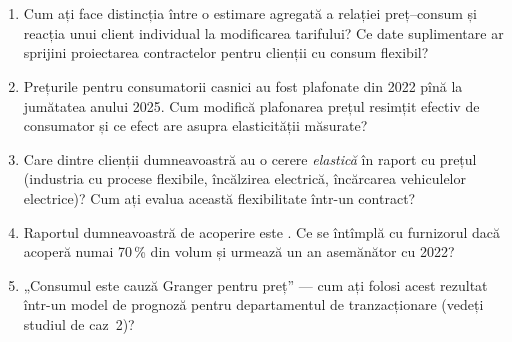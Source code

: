 \section{}
\begin{enumerate}
\item {}%
{Cum ați face distincția între o estimare agregată a relației preț--consum și reacția unui client individual la modificarea tarifului? Ce date suplimentare ar sprijini proiectarea contractelor pentru clienții cu consum flexibil?}
\item {}%
{Prețurile pentru consumatorii casnici au fost plafonate din 2022 pînă la jumătatea anului 2025. Cum modifică plafonarea prețul resimțit efectiv de consumator și ce efect are asupra elasticității măsurate?}
\item {}%
{Care dintre clienții dumneavoastră au o cerere \emph{elastică} în raport cu prețul (industria cu procese flexibile, încălzirea electrică, încărcarea vehiculelor electrice)? Cum ați evalua această flexibilitate într-un contract?}
\item {}%
{Raportul dumneavoastră de acoperire este \NhStar. Ce se întîmplă cu furnizorul dacă acoperă numai 70\,\% din volum și urmează un an asemănător cu 2022?}
\item {}%
{„Consumul este cauză Granger pentru preț” --- cum ați folosi acest rezultat într-un model de prognoză pentru departamentul de tranzacționare (vedeți studiul de caz~2)?}
\end{enumerate}

